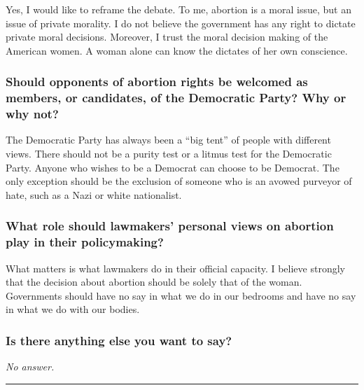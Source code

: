 Yes, I would like to reframe the debate. To me, abortion is a moral
issue, but an issue of private morality. I do not believe the government
has any right to dictate private moral decisions. Moreover, I trust the
moral decision making of the American women. A woman alone can know the
dictates of her own conscience.

\hypertarget{should-opponents-of-abortion-rights-be-welcomed-as-members-or-candidates-of-the-democratic-party-why-or-why-not-8}{%
\subsubsection{Should opponents of abortion rights be welcomed as
members, or candidates, of the Democratic Party? Why or why
not?}\label{should-opponents-of-abortion-rights-be-welcomed-as-members-or-candidates-of-the-democratic-party-why-or-why-not-8}}

The Democratic Party has always been a ``big tent'' of people with
different views. There should not be a purity test or a litmus test for
the Democratic Party. Anyone who wishes to be a Democrat can choose to
be Democrat. The only exception should be the exclusion of someone who
is an avowed purveyor of hate, such as a Nazi or white nationalist.

\hypertarget{what-role-should-lawmakers-personal-views-on-abortion-play-in-their-policymaking-8}{%
\subsubsection{What role should lawmakers' personal views on abortion
play in their
policymaking?}\label{what-role-should-lawmakers-personal-views-on-abortion-play-in-their-policymaking-8}}

What matters is what lawmakers do in their official capacity. I believe
strongly that the decision about abortion should be solely that of the
woman. Governments should have no say in what we do in our bedrooms and
have no say in what we do with our bodies.

\hypertarget{is-there-anything-else-you-want-to-say-8}{%
\subsubsection{Is there anything else you want to
say?}\label{is-there-anything-else-you-want-to-say-8}}

\emph{No answer.}

\begin{center}\rule{0.5\linewidth}{\linethickness}\end{center}


